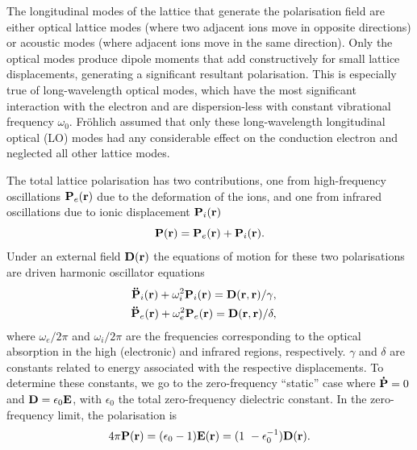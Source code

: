 The longitudinal modes of the lattice that generate the polarisation field are either optical lattice modes (where two adjacent ions move in opposite directions) or acoustic modes (where adjacent ions move in the same direction). Only the optical modes produce dipole moments that add constructively for small lattice displacements, generating a significant resultant polarisation. This is especially true of long-wavelength optical modes, which have the most significant interaction with the electron and are dispersion-less with constant vibrational frequency $\omega_0$. Fr\"ohlich assumed that only these long-wavelength longitudinal optical (LO) modes had any considerable effect on the conduction electron and neglected all other lattice modes. 

The total lattice polarisation has two contributions, one from high-frequency oscillations $\vb{P}_{e}(\vb{r})$ due to the deformation of the ions, and one from infrared oscillations due to ionic displacement $\vb{P}_{i}(\vb{r})$
\begin{equation}
    \vb{P}(\vb{r}) = \vb{P}_{e}(\vb{r}) + \vb{P}_{i}(\vb{r}).
\label{eqn-2121-7}
\end{equation}
Under an external field $\vb{D}(\vb{r})$ the equations of motion for these two polarisations are driven harmonic oscillator equations
\begin{subequations}
\begin{align}
    \begin{split}
        \vb{\ddot{P}}_{i}(\vb{r}) + \omega^2_{i} \vb{P}_{i}(\vb{r}) &= \vb{D}(\vb{r}, \vb{r}) / \gamma,
    \end{split}\\
    \begin{split}
        \vb{\ddot{P}}_{e}(\vb{r}) + \omega^2_{e} \vb{P}_{e}(\vb{r}) &= \vb{D}(\vb{r}, \vb{r}) / \delta,
    \end{split}
\end{align}
\label{eqn-2121-8}
\end{subequations}
where $\omega_{e}/2\pi$ and $\omega_{i}/2\pi$ are the frequencies corresponding to the optical absorption in the high (electronic) and infrared regions, respectively. $\gamma$ and $\delta$ are constants related to energy associated with the respective displacements. To determine these constants, we go to the zero-frequency ``static'' case where $\vb{\dot{P}} = 0$ and $\vb{D} = \epsilon_0 \vb{E}$, with $\epsilon_0$ the total zero-frequency dielectric constant. In the zero-frequency limit, the polarisation is
\begin{equation}
    4\pi \vb{P}(\vb{r}) = (\epsilon_0 - 1) \vb{E}(\vb{r}) = (1\ - \epsilon_0^{-1}) \vb{D}(\vb{r}).
\label{eqn-2121-9}
\end{equation}
